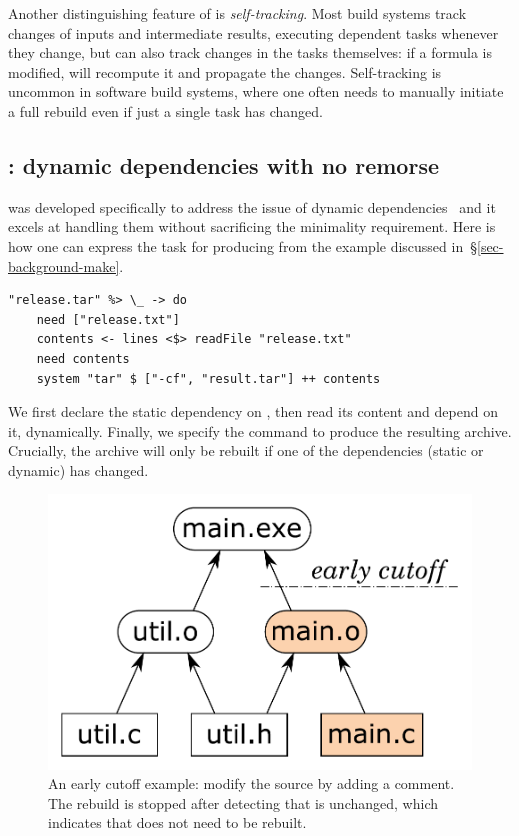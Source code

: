 Another distinguishing feature of \Excel is \emph{self-tracking}. Most build
systems track changes of inputs and intermediate results, executing dependent
tasks whenever they change, but \Excel can also track changes in the tasks
themselves: if a formula is modified, \Excel will recompute it and propagate
the changes. Self-tracking is uncommon in software build systems, where one
often needs to manually initiate a full rebuild even if just a single task has
changed.

\subsection{\Shake: dynamic dependencies with no remorse}
\label{sec-background-shake}

\Shake was developed specifically to address the issue of dynamic
dependencies~\cite{mitchell2012shake} and it excels at handling them without
sacrificing the minimality requirement. Here is how one can express the task
for producing  from the example discussed
in~\S\ref{sec-background-make}.

\vspace{1mm}
\begin{verbatim}
"release.tar" %> \_ -> do
    need ["release.txt"]
    contents <- lines <$> readFile "release.txt"
    need contents
    system "tar" $ ["-cf", "result.tar"] ++ contents
\end{verbatim}
\vspace{1mm}

\noindent
We first declare the static dependency on , then read its
content and depend on it, dynamically. Finally, we specify the command to
produce the resulting archive. Crucially, the archive will only be rebuilt if
one of the dependencies (static or dynamic) has changed.


\begin{figure}[h]
\centerline{\includegraphics[scale=0.28]{fig/make-example-cutoff.pdf}}
\vspace{-2mm}
\caption{An early cutoff example: modify the source  by adding a
comment. The rebuild is stopped after detecting that  is unchanged,
which indicates that  does not need to be rebuilt.\label{fig-cutoff}}
\end{figure}

